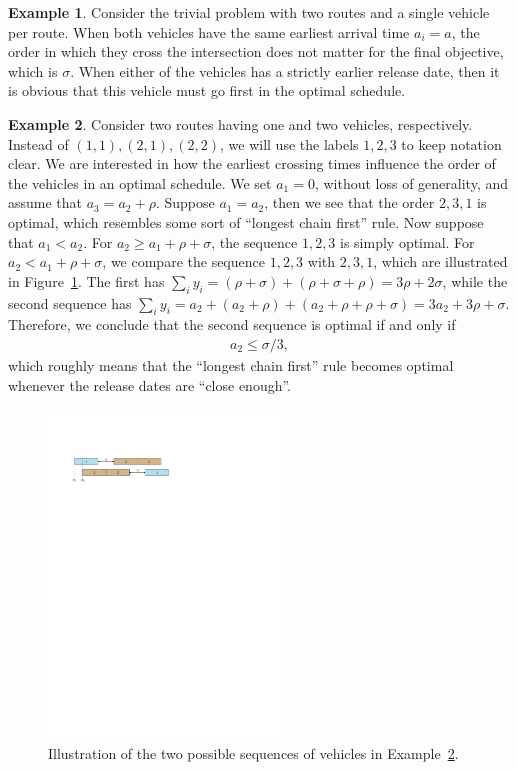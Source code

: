 \documentclass[a4paper]{report}
\theoremstyle{definition}
\newtheorem{eg}{Example}[chapter]
\theoremstyle{plain}
\begin{document}
\begin{eg}
  Consider the trivial problem with two routes and a single vehicle per route.
  When both vehicles have the same earliest arrival time $a_{i} = a$, the order
  in which they cross the intersection does not matter for the final objective,
  which is $\sigma$. When either of the vehicles has a strictly earlier release
  date, then it is obvious that this vehicle must go first in the optimal
  schedule.
\end{eg}
%
\begin{eg}
  \label{example2}
  Consider two routes having one and two vehicles, respectively. Instead of
  $(1,1), (2,1), (2,2)$, we will use the labels $1, 2, 3$ to keep notation
  clear. We are interested in how the earliest crossing times influence the
  order of the vehicles in an optimal schedule. We set $a_{1} = 0$, without loss
  of generality, and assume that $a_{3} = a_{2} + \rho$. Suppose
  $a_{1} = a_{2}$, then we see that the order $2, 3, 1$ is optimal, which
  resembles some sort of ``longest chain first'' rule. Now suppose that
  $a_{1} < a_{2}$. For $a_{2} \geq a_{1} + \rho + \sigma$, the sequence
  $1, 2, 3$ is simply optimal. For $a_{2} < a_{1} + \rho + \sigma$, we compare
  the sequence $1, 2, 3$ with $2, 3, 1$, which are illustrated in
  Figure~\ref{fig:example2}. The first has
  $\sum_{i} y_{i} = (\rho+\sigma) + (\rho+\sigma+\rho) = 3\rho + 2\sigma$,
  while the second sequence has
  $\sum_{i} y_{i} = a_{2} + (a_{2} + \rho) + (a_{2} + \rho + \rho + \sigma) = 3 a_{2} + 3\rho + \sigma$.
  Therefore, we conclude that the second sequence is optimal if and only if
  \begin{align}
    \label{eq:before-condition}
    a_{2} \leq \sigma/3 ,
  \end{align}
  which roughly means that the ``longest chain first'' rule becomes optimal
  whenever the release dates are ``close enough''.
\end{eg}
%
\begin{figure}[t]
  \centering
  \includegraphics[width=0.55\textwidth]{figures/single/123.pdf}
  \caption{Illustration of the two possible sequences of vehicles in
    Example~\ref{example2}.}
  \label{fig:example2}
\end{figure}
\end{document}
